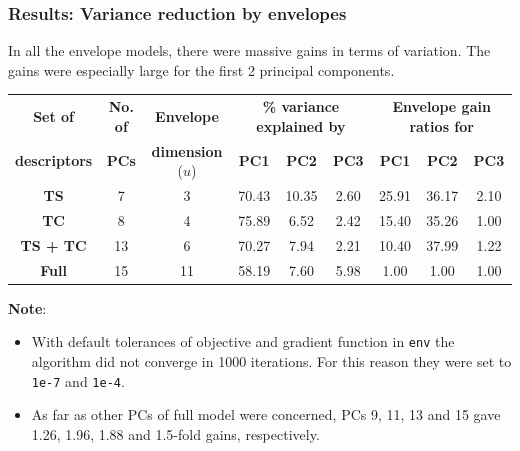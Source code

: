 \documentclass[handout,10pt]{beamer}
\begin{document}
\begin{frame}
\frametitle{Results: Variance reduction by envelopes}
In all the envelope models, there were massive gains in terms of variation. The gains were especially large for the first 2 principal components.
\vspace{.2cm}

\begin{scriptsize}
\begin{table}\centering
    \begin{tabular}{|c|c|c||c|c|c|c|c|c|}\hline
    \textbf{Set of} & \textbf{No. of} & \textbf{Envelope} & 
    \multicolumn{3}{c|}{\textbf{\% variance explained by}} & \multicolumn{3}{c|}{\textbf{Envelope gain ratios for}}\\\cline{4-9}
    \textbf{descriptors}                  & \textbf{PCs}                                                 & \textbf{dimension} ($u$) & \textbf{PC1}                      & \textbf{PC2}   & \textbf{PC3}  & \textbf{PC1}                & \textbf{PC2}   & \textbf{PC3}  \\\hline\hline
    \textbf{TS}                 & 7                                                 & 3                        & 70.43                    & 10.35 & 2.60 & 25.91              & 36.17 & 2.10 \\ \hline
    \textbf{TC}                 & 8                                                 & 4                        & 75.89                    & 6.52  & 2.42 & 15.40              & 35.26 & 1.00 \\\hline
    \textbf{TS + TC}            & 13                                                & 6                        & 70.27                    & 7.94  & 2.21 & 10.40              & 37.99 & 1.22 \\\hline
    \textbf{Full} & 15 & 11 & 58.19 & 7.60 & 5.98 & 1.00 & 1.00 & 1.00 \\\hline
    \end{tabular}
\end{table}
\end{scriptsize}
\vspace{.2cm}
\textbf{Note}:
\begin{itemize}
\item With default tolerances of objective and gradient function in \texttt{env} the algorithm did not converge in 1000 iterations. For this reason they were set to \texttt{1e-7} and \texttt{1e-4}.
\vspace{.2cm}
\item As far as other PCs of full model were concerned, PCs 9, 11, 13 and 15 gave 1.26, 1.96, 1.88 and 1.5-fold gains, respectively.
\end{itemize}
\end{frame}
\end{document}
